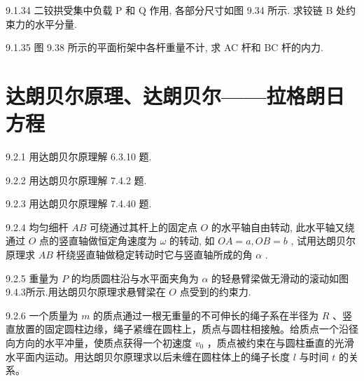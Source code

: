 \begin{problem}{9.1.34}
二铰拱受集中负载 P 和 Q 作用, 各部分尺寸如图 9.34 所示. 求铰链 B 处约束力的水平分量.
\begin{center}

\end{center}
\end{problem}
\clearpage


\begin{problem}{9.1.35}
图 9.38 所示的平面桁架中各杆重量不计, 求 AC 杆和 BC 杆的内力.
\begin{center}

\end{center}
\end{problem}
\clearpage


\section{达朗贝尔原理、达朗贝尔——拉格朗日方程}

\begin{problem}{9.2.1}
用达朗贝尔原理解 6.3.10 题.
\end{problem}
\clearpage


\begin{problem}{9.2.2}
用达朗贝尔原理解 7.4.2 题.
\end{problem}
\clearpage


\begin{problem}{9.2.3}
用达朗贝尔原理解 7.4.40 题.
\end{problem}
\clearpage


\begin{problem}{9.2.4}
均匀细杆 $AB$ 可绕通过其杆上的固定点 $O$ 的水平轴自由转动, 此水平轴又绕通过 $O$ 点的竖直轴做恒定角速度为 $\omega$ 的转动, 如 $OA = a, OB = b$ , 试用达朗贝尔原理求 $AB$ 杆绕竖直轴做稳定转动时它与竖直轴所成的角 $\alpha$ .
\end{problem}
\clearpage


\begin{problem}{9.2.5}
重量为 $P$ 的均质圆柱沿与水平面夹角为 $\alpha$ 的轻悬臂梁做无滑动的滚动如图9.4.3所示.用达朗贝尔原理求悬臂梁在 $O$ 点受到的约束力.
\begin{center}

\end{center}
\end{problem}
\clearpage


\begin{problem}{9.2.6}
一个质量为 $m$ 的质点通过一根无重量的不可伸长的绳子系在半径为 $R$ 、竖直放置的固定圆柱边缘，绳子紧缠在圆柱上，质点与圆柱相接触。给质点一个沿径向方向的水平冲量，使质点获得一个初速度 $v_0$ ，质点被约束在与圆柱垂直的光滑水平面内运动。用达朗贝尔原理求以后未缠在圆柱体上的绳子长度 $l$ 与时间 $t$ 的关系。
\begin{center}

\end{center}
\end{problem}
\clearpage


